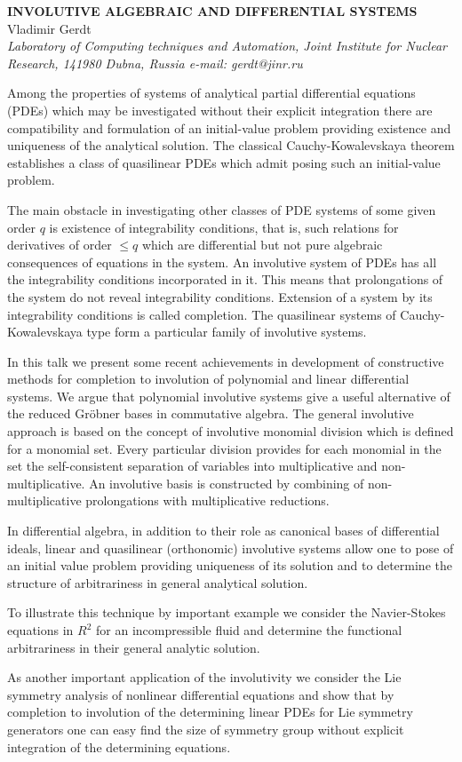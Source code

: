 \documentclass[11pt, draft]{article}
\begin{document}

\begin{center}
{\bf
INVOLUTIVE ALGEBRAIC AND DIFFERENTIAL SYSTEMS}\\
\vspace {0.3cm}
{Vladimir Gerdt}\\
{\it \small Laboratory of Computing techniques and Automation, Joint Institute for Nuclear
Research, 141980 Dubna, Russia e-mail: gerdt@jinr.ru}
\end{center}
\vspace {1.0cm}
Among the properties of systems of analytical partial differential
equations (PDEs) which may be investigated without their explicit
integration there are compatibility and formulation of an initial-value
problem providing existence and uniqueness of the analytical solution.
The classical Cauchy-Kowalevskaya theorem establishes a class of
quasilinear PDEs which admit posing such an initial-value
problem.

The main obstacle in investigating other classes of PDE systems of
some given order $q$ is existence of integrability conditions,
that is, such relations for derivatives of order $\leq q$ which are
differential but not pure algebraic consequences of equations in
the system.  An involutive system of PDEs has all the integrability
conditions incorporated in it. This means that prolongations of the
system do not reveal integrability conditions. Extension of a
system by its integrability conditions is called completion.
The quasilinear systems of Cauchy-Kowalevskaya type form a particular
family of involutive systems.

In this talk we present some recent achievements in development of
constructive methods for completion to involution of polynomial and
linear differential systems. We argue that polynomial involutive
systems give a useful alternative of the reduced Gr\"{o}bner bases
in commutative algebra. The general involutive approach is based on the
concept of involutive monomial division which is defined for a
monomial set. Every particular division provides for each monomial in
the set the self-consistent separation of variables into multiplicative
and non-multiplicative. An involutive basis is constructed by combining of
non-multiplicative prolongations with multiplicative reductions.

In differential algebra, in addition to their role as canonical bases of
differential ideals, linear and quasilinear (orthonomic) involutive systems
allow one to pose of an initial value problem providing uniqueness of
its solution and to determine the structure of arbitrariness in general
analytical solution.

To illustrate this technique by important example we consider the Navier-Stokes
equations in $R^2$ for an incompressible fluid and determine the functional
arbitrariness in their general analytic solution.

As another important application of the involutivity we consider the
Lie symmetry analysis of nonlinear differential equations and show that by
completion to involution of the determining linear PDEs for Lie symmetry
generators one can easy find the size of symmetry group without explicit
integration of the determining equations.
\end{document}
